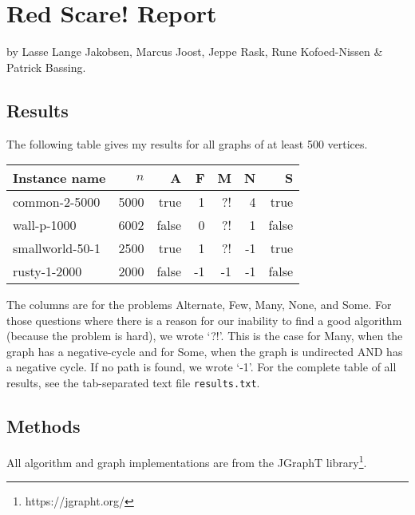 \documentclass{article}
\begin{document}
\section{Red Scare! Report}

by Lasse Lange Jakobsen, Marcus Joost, Jeppe Rask, Rune Kofoed-Nissen \& Patrick Bassing.

\subsection{Results}

The following table gives my results for all graphs of at least 500 vertices.

\medskip
\begin{tabular}{lrrrrrr}
  \toprule
  Instance name & $n$ & A & F & M & N & S \\
  \midrule
  common-2-5000 & 5000 & true & 1 & ?! & 4 & true \\
  wall-p-1000 & 6002 & false & 0 & ?! & 1 & false\\
  smallworld-50-1 & 2500 & true & 1 & ?! & -1 & true\\
  rusty-1-2000 & 2000 & false & -1 & -1 & -1 & false
  \bottomrule
\end{tabular}
\medskip

\noindent The columns are for the problems Alternate, Few, Many, None, and Some.
For those questions where there is a reason for our inability to find a good algorithm (because the problem is hard), we wrote `?!'.
This is the case for Many, when the graph has a negative-cycle and for Some, when the graph is undirected AND has a negative cycle.
If no path is found, we wrote `-1'.
For the complete table of all results, see the tab-separated text file {\tt results.txt}.

\subsection{Methods}
All algorithm and graph implementations are from the JGraphT library\footnote{https://jgrapht.org/}.
\end{document}
